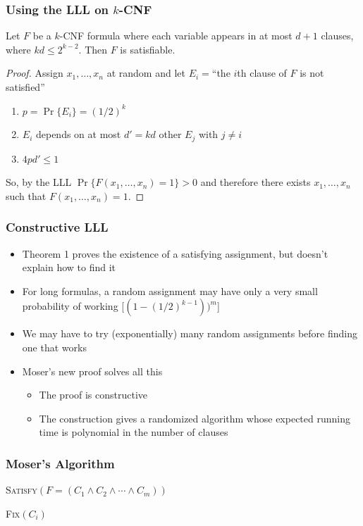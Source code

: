 \documentclass{beamer}
\begin{document}
\frame
{
  \frametitle{Using the LLL on $k$-CNF}

  \begin{thm}
    Let $F$ be a $k$-CNF formula where each variable appears in
    at most $d+1$ clauses, where $kd \le 2^{k-2}$.  Then $F$
    is satisfiable.
  \end{thm}
  \begin{proof}
    Assign $x_1,\ldots,x_n$ at random and let
    $E_i=$``the $i$th clause of $F$ is not satisfied''
    \begin{enumerate}
    \item $p=\Pr\{E_i\} = (1/2)^k$
    \item $E_i$ depends on at most $d'=kd$ other $E_j$ with $j\neq i$
    \item $4pd' \le 1$
  \end{enumerate}
  So, by the LLL $\Pr\{F(x_1,\ldots,x_n)=1\} > 0$ and therefore there
exists $x_1,\ldots,x_n$ such that $F(x_1,\ldots,x_n) = 1$.
  \end{proof}
}

\frame
{
  \frametitle{Constructive LLL}

  \begin{itemize}
    \item Theorem 1 proves the existence of a satisfying assignment, but
          doesn't explain how to find it
    \item For long formulas, a random assignment may have only a  very 
       small probability of working [$(1-(1/2)^{k-1}))^m$]
    \item We may have to try (exponentially) many random assignments before
       finding one that works
    \item Moser's new proof solves all this
    \begin{itemize}
      \item The proof is constructive
      \item The construction gives a randomized algorithm whose expected
            running time is polynomial in the number of clauses
    \end{itemize}
  \end{itemize}
}




\frame
{
  \frametitle{Moser's Algorithm}

  \noindent\textsc{Satisfy$(F=(C_1\wedge C_2\wedge\cdots\wedge C_m))$}
  \begin{algorithmic}
     \ENDIF
   \ENDFOR
  \end{algorithmic}
  \vspace{1ex}
  \noindent\textsc{Fix$(C_i)$}
  \begin{algorithmic}
     \ENDIF
   \ENDFOR
  \end{algorithmic}
}
\end{document}

